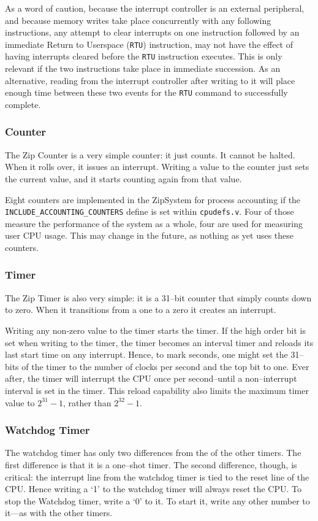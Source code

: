 \documentclass{gqtekspec}
\begin{document}
As a word of caution, because the interrupt controller is an external
peripheral, and because memory writes take place concurrently with any following
instructions, any attempt to clear interrupts on one instruction followed by
an immediate Return to Userspace ({\tt RTU}) instruction, may not have the
effect of having interrupts cleared before the {\tt RTU} instruction executes.
This is only relevant if the two instructions take place in immediate
succession.  As an alternative, reading from the interrupt controller after
writing to it will place enough time between these two events for the
{\tt RTU} command to successfully complete.
\subsubsection{Counter}
The Zip Counter is a very simple counter: it just counts.  It cannot be
halted.  When it rolls over, it issues an interrupt.  Writing a value to the
counter just sets the current value, and it starts counting again from that
value.

Eight counters are implemented in the ZipSystem for process accounting if
the {\tt INCLUDE\_ACCOUNTING\_COUNTERS} define is set within {\tt cpudefs.v}.
Four of those measure the performance of the system as a whole, four are
used for measuring user CPU usage.
This may change in the future, as nothing as yet uses these counters.
\subsubsection{Timer}
The Zip Timer is also very simple: it is a 31--bit counter that simply counts
down to zero.  When it transitions from a one to a zero it creates an interrupt.

Writing any non-zero value to the timer starts the timer.  If the high order
bit is set when writing to the timer, the timer becomes an interval timer and
reloads its last start time on any interrupt.  Hence, to mark seconds, one
might set the 31--bits of the timer to the number of clocks per second and the
top bit to one.  Ever after, the timer will interrupt the CPU once per
second--until a non--interrupt interval is set in the timer.  This reload
capability also limits the maximum timer value to $2^{31}-1$, rather than
$2^{32}-1$.
\subsubsection{Watchdog Timer}
The watchdog timer has only two differences from the of the other timers.
The first difference is that it is a one--shot timer.  The second difference,
though, is critical: the interrupt line from the watchdog timer is tied to the
reset line of the CPU.  Hence writing a `1' to the watchdog timer will always
reset the CPU.  To stop the Watchdog timer, write a `0' to it.  To start it,
write any other number to it---as with the other timers.
\end{document}
